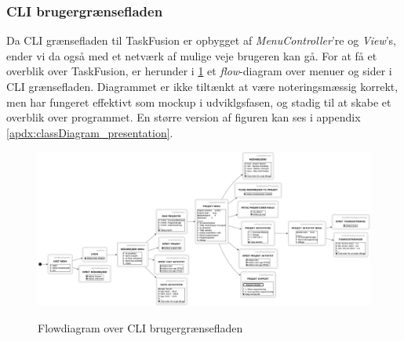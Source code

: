 \subsubsection{CLI brugergrænsefladen}
Da CLI grænsefladen til TaskFusion er opbygget af \textit{MenuController}'re og \textit{View}'s, ender vi da også med et netværk af mulige veje brugeren kan gå. For at få et overblik over TaskFusion, er herunder i \cref{fig:flow_cli} et \textit{flow}-diagram over menuer og sider i CLI grænsefladen. Diagrammet er ikke tiltænkt at være noteringsmæssig korrekt, men har fungeret effektivt som mockup i udviklgsfasen, og stadig til at skabe et overblik over programmet. En større version af figuren kan ses i appendix \cref{apdx:classDiagram_presentation}.
\begin{figure}[H]
    \centering
    \caption{Flowdiagram over CLI brugergrænsefladen}
    \includegraphics[width = \textwidth]{TaskFusion/out/assets/diagrams/flow_cli/flow_cli.png}
    \label{fig:flow_cli}
\end{figure}